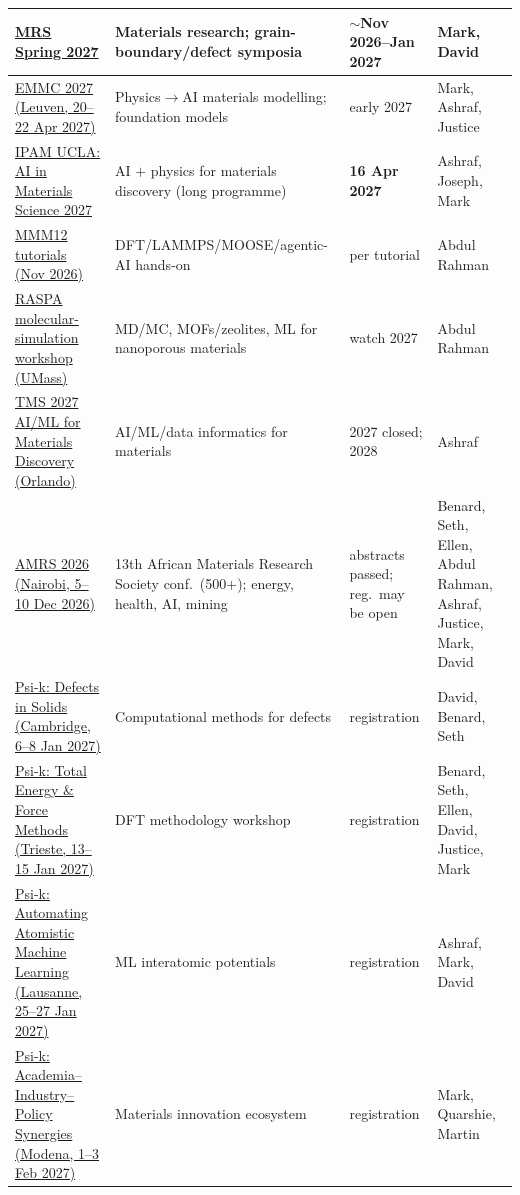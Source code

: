 \documentclass[11pt,a4paper]{article}
\begin{document}
\begin{longtable}{@{}p{3.4cm}p{5.6cm}p{2.2cm}p{2.7cm}@{}}
\midrule
\href{https://www.mrs.org/docs/default-source/meetings-events/spring-meetings/2027/s27-call-for-abstracts.pdf}{MRS Spring 2027} & Materials research; grain-boundary/defect symposia & $\sim$Nov 2026--Jan 2027 & Mark, David \\
\midrule
\href{https://emmc.eu/events/emmc2027/}{EMMC 2027 (Leuven, 20--22 Apr 2027)} & Physics$\rightarrow$AI materials modelling; foundation models & early 2027 & Mark, Ashraf, Justice \\
\midrule
\href{https://atomgrants.com/grant/artificial-intelligence-materials-science-institute-for-pure-and-applied-mathematics}{IPAM UCLA: AI in Materials Science 2027} & AI $+$ physics for materials discovery (long programme) & \textbf{16 Apr 2027} & Ashraf, Joseph, Mark \\
\midrule
\href{https://www.mmm12.org/tutorial-sessions/}{MMM12 tutorials (Nov 2026)} & DFT/LAMMPS/MOOSE/agentic-AI hands-on & per tutorial & Abdul Rahman \\
\midrule
\href{https://bai.group/blog/raspa-workshop-2026/}{RASPA molecular-simulation workshop (UMass)} & MD/MC, MOFs/zeolites, ML for nanoporous materials & watch 2027 & Abdul Rahman \\
\midrule
\href{https://www.tms.org/tms2027/downloads/flyers/TMS2027-CFA-Flyer-022.pdf}{TMS 2027 AI/ML for Materials Discovery (Orlando)} & AI/ML/data informatics for materials & 2027 closed; 2028 & Ashraf \\
\midrule
\href{https://africanmrs.net/kenya-2026/}{AMRS 2026 (Nairobi, 5--10 Dec 2026)} & 13th African Materials Research Society conf.\ (500+); energy, health, AI, mining & abstracts passed; reg.\ may be open & Benard, Seth, Ellen, Abdul Rahman, Ashraf, Justice, Mark, David \\
\midrule
\href{https://psi-k.net/workshops/}{Psi-k: Defects in Solids (Cambridge, 6--8 Jan 2027)} & Computational methods for defects & registration & David, Benard, Seth \\
\midrule
\href{https://psi-k.net/workshops/}{Psi-k: Total Energy \& Force Methods (Trieste, 13--15 Jan 2027)} & DFT methodology workshop & registration & Benard, Seth, Ellen, David, Justice, Mark \\
\midrule
\href{https://psi-k.net/workshops/}{Psi-k: Automating Atomistic Machine Learning (Lausanne, 25--27 Jan 2027)} & ML interatomic potentials & registration & Ashraf, Mark, David \\
\midrule
\href{https://psi-k.net/workshops/}{Psi-k: Academia--Industry--Policy Synergies (Modena, 1--3 Feb 2027)} & Materials innovation ecosystem & registration & Mark, Quarshie, Martin \\

\end{longtable}
\end{document}
